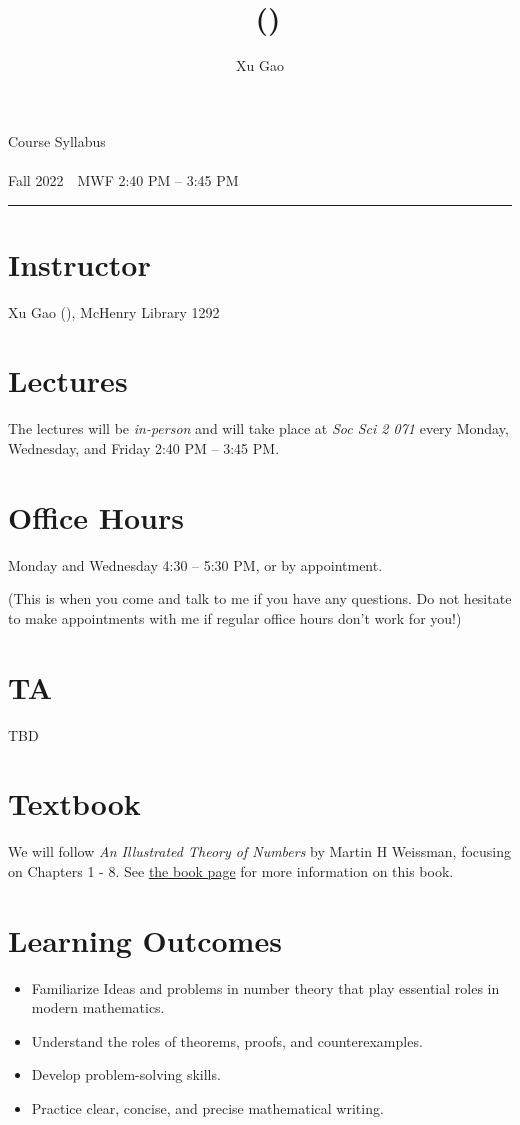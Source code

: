 \documentclass[12pt]{article}
\title{\coursenumber~(\coursetitle)}
\author{Xu Gao}
\makeatletter
\def\suptitle{}
\def\subtitle{}
\def\coursequarter{}
\def\coursedate{}
\renewcommand\maketitle{
{\raggedright %
\begin{center}
	\ttfamily
	{\large\color{SkyBlue}\suptitle}\\[2ex]
	{\LARGE\@title}\\[2ex]
	{\large\subtitle}\\[2ex]\hrule
\end{center}}} %
\renewcommand\suptitle{Course Syllabus}
\renewcommand\subtitle{\coursequarter~\textbullet~\coursedate}
\renewcommand\coursequarter{Fall 2022}
\renewcommand\coursedate{MWF 2:40 PM -- 3:45 PM}
\makeatother
\begin{document}
\thispagestyle{firstpage}
\maketitle

\section{Instructor} 
Xu Gao (), McHenry Library 1292

\section{Lectures}  
The lectures will be \emph{in-person} and will take place at \emph{Soc Sci 2 071} every Monday, Wednesday, and Friday 2:40 PM -- 3:45 PM. 

\section{Office Hours}
Monday and Wednesday 4:30 -- 5:30 PM, or by appointment. 

\noindent
{\footnotesize (This is when you come and talk to me if you have any questions. Do not hesitate to make appointments with me if regular office hours don't work for you!)}

\section{TA} 
TBD

\section{Textbook} We will follow \textit{\color{MidnightBlue} An Illustrated Theory of Numbers} by Martin H Weissman, focusing on Chapters 1 - 8. See \href{http://illustratedtheoryofnumbers.com/}{the book page} for more information on this book. 

\section{Learning Outcomes}
\begin{itemize}
	\item Familiarize Ideas and problems in number theory that play essential roles in modern mathematics.
	\item Understand the roles of theorems, proofs, and counterexamples. 
	\item Develop problem-solving skills.
	\item Practice clear, concise, and precise mathematical writing.
\end{itemize}	
\end{document}
